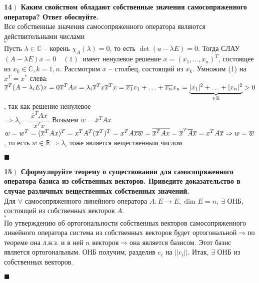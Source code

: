 \documentclass[a4paper,12pt]{article}
\begin{document}
    \textbf{14$\left.\right)$ Каким свойством обладают собственные значения самосопряженного оператора? Ответ обоснуйте.}\\
    Все собственные значения самосопряженного оператора являются действительными числами\\
    $\square$\\
    Пусть $\lambda\in\mathbb{C}$ -- корень $\chi_A(\lambda)=0$, то есть $\det(a-\lambda E)=0$. Тогда СЛАУ $(A-\lambda E)x=0\quad (1)\ $ имеет ненулевое решение $x=(x_1, \ldots, x_n)^T$, состоящее из $x_k\in\mathbb{C}, k=\overline{1, n}$. Рассмотрим $\overline x$ -- столбец, состоящий из $\overline{x_k}$. Умножим (1) на $\overline x^T=x^*$ слева:\\
    $\overline x^T(A-\lambda_iE)x=0\\
    \overline x^T Ax=\lambda_i\overline x^Tx\\
    \overline x^Tx=\overline{x_1}x_1+\ldots+\overline{x_n}x_n=\underbrace{|x_1|^2+\ldots+|x_n|^2}_{\in\mathbb{R}}>0$, так как решение ненулевое\\
    $\Rightarrow \lambda_i=\dfrac{\overline x^TAx}{\overline x^Tx}$. Возьмем $w=\overline x^TAx$\\
    $w=w^T=(\overline x^TAx)^T=x^TA^T(\overline x^T)^T=x^TA\overline x\\
    \overline w=\overline{\overline x^TAx}=\overline{\overline x}^T\overline A\overline x=x^TA\overline x\Rightarrow w=\overline w$, то есть $w\in\mathbb{R}\Rightarrow\lambda_i$ тоже является вещественным числом
    \begin{flushright}
        $\blacksquare$
    \end{flushright}

    \textbf{15$\left.\right)$ Сформулируйте теорему о существовании для самосопряженного оператора базиса из собственных векторов. Приведите доказательство в случае различных вещественных собственных значений.}\\
    Для $\forall$ самосопряженного линейного оператора $A:E\rightarrow E, \dim E=n, \ \exists$ ОНБ, состоящий из собственных векторов $A$.\\
    $\square$\\
    По утверждению об ортогональности собственных векторов самосопряженного линейного оператора система из собственных векторов будет ортогональной$\Rightarrow$по теореме она л.н.з. и в ней $n$ векторов$\Rightarrow$она является базисом. Этот базис является ортогональным. ОНБ получим, разделив $e_i$ на $||e_i||$. Итак, $\exists$ ОНБ из собственных векторов.
    \begin{flushright}
        $\blacksquare$
    \end{flushright}
\end{document}
